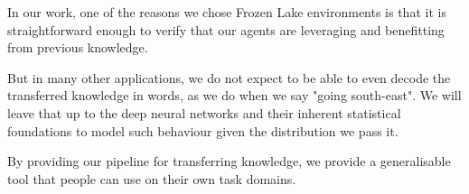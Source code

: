 In our work, one of the reasons we chose Frozen Lake environments is that it is straightforward enough to verify that our agents are leveraging and benefitting from previous knowledge.

But in many other applications, we do not expect to be able to even decode the transferred knowledge in words, as we do when we say "going south-east". We will leave that up to the deep neural networks and their inherent statistical foundations to model such behaviour given the distribution we pass it.

By providing our pipeline for transferring knowledge, we provide a generalisable tool that people can use on their own task domains.

